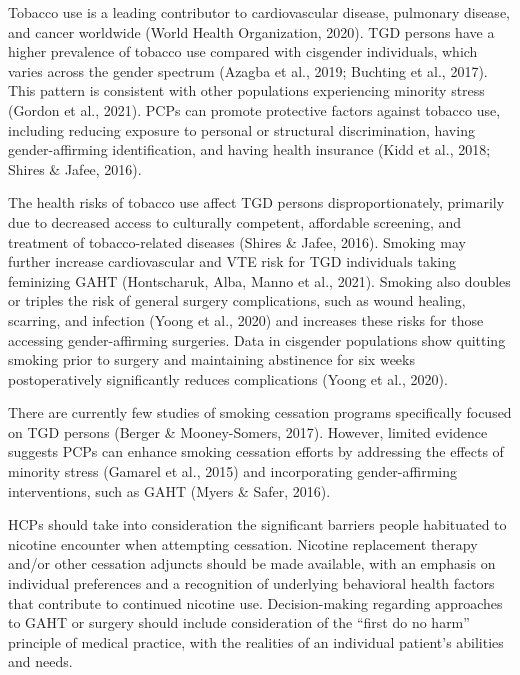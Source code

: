 \documentclass[
]{book}
\begin{document}
Tobacco use is a leading contributor to cardiovascular disease, pulmonary disease, and cancer worldwide (World Health Organization, 2020).
TGD persons have a higher prevalence of tobacco
use compared with cisgender individuals, which
varies across the gender spectrum (Azagba et al.,
2019; Buchting et al., 2017). This pattern is consistent with other populations experiencing
minority stress (Gordon et al., 2021). PCPs can
promote protective factors against tobacco use,
including reducing exposure to personal or structural discrimination, having gender-affirming
identification, and having health insurance (Kidd
et al., 2018; Shires \& Jafee, 2016).

The health risks of tobacco use affect TGD
persons disproportionately, primarily due to
decreased access to culturally competent, affordable screening, and treatment of tobacco-related
diseases (Shires \& Jafee, 2016). Smoking may
further increase cardiovascular and VTE risk for
TGD individuals taking feminizing GAHT
(Hontscharuk, Alba, Manno et al., 2021). Smoking
also doubles or triples the risk of general surgery
complications, such as wound healing, scarring,
and infection (Yoong et al., 2020) and increases
these risks for those accessing gender-affirming
surgeries. Data in cisgender populations show
quitting smoking prior to surgery and maintaining abstinence for six weeks postoperatively significantly reduces complications (Yoong
et al., 2020).

There are currently few studies of smoking
cessation programs specifically focused on TGD
persons (Berger \& Mooney-Somers, 2017).
However, limited evidence suggests PCPs can
enhance smoking cessation efforts by addressing
the effects of minority stress (Gamarel et al.,
2015) and incorporating gender-affirming interventions, such as GAHT (Myers \& Safer, 2016).

HCPs should take into consideration the significant barriers people habituated to nicotine
encounter when attempting cessation. Nicotine
replacement therapy and/or other cessation
adjuncts should be made available, with an emphasis on individual preferences and a recognition of
underlying behavioral health factors that contribute
to continued nicotine use. Decision-making
regarding approaches to GAHT or surgery should
include consideration of the ``first do no harm''
principle of medical practice, with the realities of
an individual patient's abilities and needs.
\end{document}
